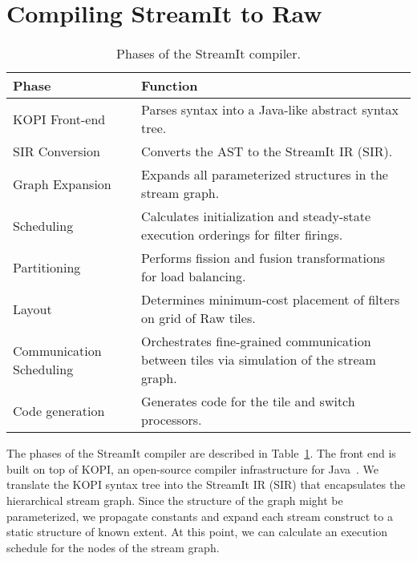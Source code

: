 \section{Compiling StreamIt to Raw}
\label{sec:phases}

\begin{table}[t]
\begin{center}
\scriptsize
\begin{tabular}{|l|l|} \hline
{\bf Phase} & {\bf Function} \\
\hline \hline
KOPI Front-end & Parses syntax into a Java-like abstract syntax tree. \\
\hline
SIR Conversion & Converts the AST to the StreamIt IR (SIR). \\
\hline
Graph Expansion & Expands all parameterized structures in the stream graph. \\
\hline
Scheduling & Calculates initialization and steady-state execution orderings for filter firings. \\
\hline
Partitioning & Performs fission and fusion transformations for load balancing. \\
\hline
Layout & Determines minimum-cost placement of filters on grid of Raw tiles. \\
\hline
Communication Scheduling & Orchestrates fine-grained communication between tiles via simulation of the stream graph. \\
\hline
Code generation & Generates code for the tile and switch processors. \\
\hline
\end{tabular}
\vspace{-6pt}
\caption{\protect\small Phases of the StreamIt compiler.
\label{tab:phases}}
\vspace{-12pt}
\end{center}
\end{table}

The phases of the StreamIt compiler are described in
Table~\ref{tab:phases}.  The front end is built on top of KOPI, an
open-source compiler infrastructure for Java~\cite{kopi}.  We
translate the KOPI syntax tree into the StreamIt IR (SIR) that
encapsulates the hierarchical stream graph.  Since the structure of
the graph might be parameterized, we propagate constants and expand
each stream construct to a static structure of known extent.  At this
point, we can calculate an execution schedule for the nodes of the
stream graph.

